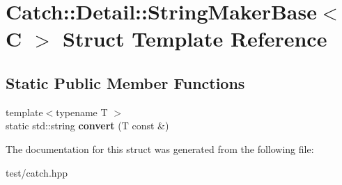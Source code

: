 \hypertarget{structCatch_1_1Detail_1_1StringMakerBase}{}\section{Catch\+:\+:Detail\+:\+:String\+Maker\+Base$<$ C $>$ Struct Template Reference}
\label{structCatch_1_1Detail_1_1StringMakerBase}
\subsection*{Static Public Member Functions}
\begin{DoxyCompactItemize}
\item 
{\footnotesize template$<$typename T $>$ }\\static std\+::string {\bfseries convert} (T const \&)\hypertarget{structCatch_1_1Detail_1_1StringMakerBase_a8eb9f635dc413a5758e22614bafaf1a3}{}\label{structCatch_1_1Detail_1_1StringMakerBase_a8eb9f635dc413a5758e22614bafaf1a3}

\end{DoxyCompactItemize}


The documentation for this struct was generated from the following file\+:\begin{DoxyCompactItemize}
\item 
test/catch.\+hpp\end{DoxyCompactItemize}
